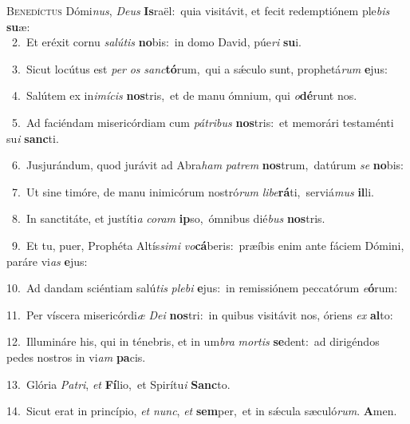 \lettrine{\initial\textcolor{\initialcolor}{B}}{enedíctus} Dómi\-\textit{nus}\-, \textit{De}\-\textit{us} \textbf{Is}\-raël:~\star quia visitávit, et fecit redemptiónem ple\textit{bis} \textbf{su}\-æ:\\
{\numbfont\textcolor{\numbcolor}{~2.}}~Et eréxit cornu \textit{sa}\-\textit{lú}\textit{tis} \textbf{no}\-bis:~\star in domo David, púe\textit{ri} \textbf{su}\-i.\par
{\numbfont\textcolor{\numbcolor}{~3.}}~Sicut locútus est \textit{per} \textit{os} \textit{sanc}\-\textbf{tó}rum,~\star qui a sǽculo sunt, prophetá\textit{rum} \textbf{e}\-jus:\par
{\numbfont\textcolor{\numbcolor}{~4.}}~Salútem ex in\-\textit{i}\-\textit{mí}\textit{cis} \textbf{nos}\-tris,~\star et de manu ómnium, qui \textit{o}\-\textbf{dé}runt nos.\par
{\numbfont\textcolor{\numbcolor}{~5.}}~Ad faciéndam misericórdiam cum \textit{pá}\-\textit{tri}\textit{bus} \textbf{nos}\-tris:~\star et memorári testaménti su\textit{i} \textbf{sanc}\-ti.\par
{\numbfont\textcolor{\numbcolor}{~6.}}~Jusjurándum, quod jurávit ad Abra\textit{ham} \textit{pa}\-\textit{trem} \textbf{nos}\-trum,~\star datúrum \textit{se} \textbf{no}\-bis:\par
{\numbfont\textcolor{\numbcolor}{~7.}}~Ut sine timóre, de manu inimicórum nostró\textit{rum} \textit{li}\-\textit{be}\textbf{rá}ti,~\star serviá\textit{mus} \textbf{il}\-li.\par
{\numbfont\textcolor{\numbcolor}{~8.}}~In sanctitáte, et justíti\textit{a} \textit{co}\-\textit{ram} \textbf{ip}\-so,~\star ómnibus dié\textit{bus} \textbf{nos}\-tris.\par
{\numbfont\textcolor{\numbcolor}{~9.}}~Et tu, puer, Prophéta Altís\-\textit{si}\-\textit{mi} \textit{vo}\-\textbf{cá}beris:~\star præíbis enim ante fáciem Dómini, paráre vi\textit{as} \textbf{e}\-jus:\par
{\numbfont\textcolor{\numbcolor}{10.}}~Ad dandam sciéntiam salú\textit{tis} \textit{ple}\-\textit{bi} \textbf{e}\-jus:~\star in remissiónem peccatórum \textit{e}\-\textbf{ó}rum:\par
{\numbfont\textcolor{\numbcolor}{11.}}~Per víscera misericórdi\textit{æ} \textit{De}\-\textit{i} \textbf{nos}\-tri:~\star in quibus visitávit nos, óriens \textit{ex} \textbf{al}\-to:\par
{\numbfont\textcolor{\numbcolor}{12.}}~Illumináre his, qui in ténebris, et in um\textit{bra} \textit{mor}\-\textit{tis} \textbf{se}\-dent:~\star ad dirigéndos pedes nostros in vi\textit{am} \textbf{pa}\-cis.\par
{\numbfont\textcolor{\numbcolor}{13.}}~Glória \textit{Pa}\-\textit{tri}, \textit{et} \textbf{Fí}\-lio,~\star et Spirítu\textit{i} \textbf{Sanc}\-to.\par
{\numbfont\textcolor{\numbcolor}{14.}}~Sicut erat in princípio, \textit{et} \textit{nunc}\-, \textit{et} \textbf{sem}\-per,~\star et in sǽcula sæculó\-\textit{rum}\-. \textbf{A}\-men.\par
